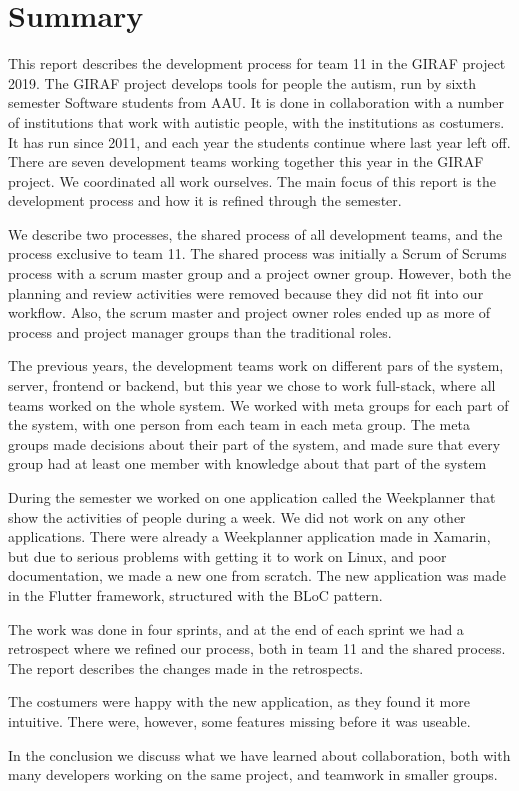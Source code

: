 \section{Summary}

This report describes the development process for team 11 in the GIRAF project 2019. The GIRAF project develops tools for people the autism, run by sixth semester Software students from AAU. It is done in collaboration with a number of institutions that work with autistic people, with the institutions as costumers. It has run since 2011, and each year the students continue where last year left off. There are seven development teams working together this year in the GIRAF project. We coordinated all work ourselves. The main focus of this report is the development process and how it is refined through the semester.

We describe two processes, the shared process of all development teams, and the process exclusive to team 11. The shared process was initially a Scrum of Scrums process with a scrum master group and a project owner group. However, both the planning and review activities were removed because they did not fit into our workflow. Also, the scrum master and project owner roles ended up as more of process and project manager groups than the traditional roles. 

The previous years, the development teams work on different pars of the system, server, frontend or backend, but this year we chose to work full-stack, where all teams worked on the whole system. We worked with meta groups for each part of the system, with one person from each team in each meta group. The meta groups made decisions about their part of the system, and made sure that every group had at least one member with knowledge about that part of the system 

During the semester we worked on one application called the Weekplanner that show the activities of people during a week. We did not work on any other applications. There were already a Weekplanner application made in Xamarin, but due to serious problems with getting it to work on Linux, and poor documentation, we made a new one from scratch. The new application was made in the Flutter framework, structured with the BLoC pattern. 

The work was done in four sprints, and at the end of each sprint we had a retrospect where we refined our process, both in team 11 and the shared process. The report describes the changes made in the retrospects.

The costumers were happy with the new application, as they found it more intuitive. There were, however, some features missing before it was useable. 

In the conclusion we discuss what we have learned about collaboration, both with many developers working on the same project, and teamwork in smaller groups. 